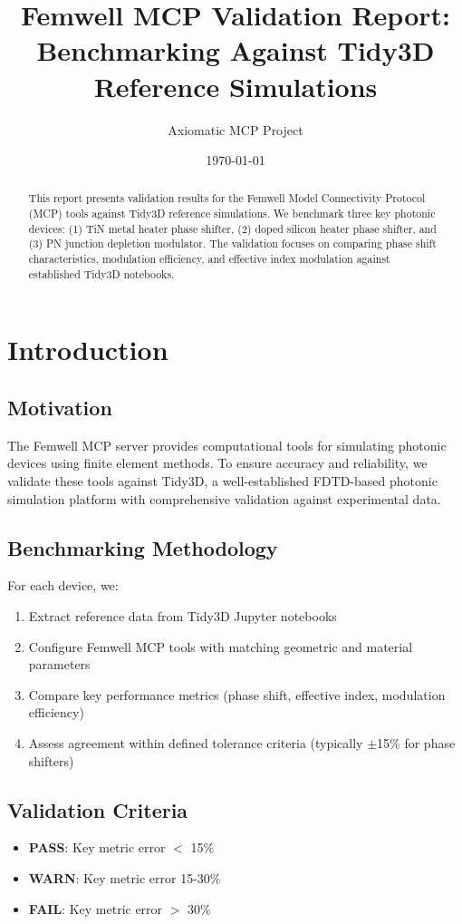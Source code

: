 \documentclass[11pt,a4paper]{article}
\title{\textbf{Femwell MCP Validation Report:\\Benchmarking Against Tidy3D Reference Simulations}}
\author{Axiomatic MCP Project}
\date{\today}
\begin{document}
\maketitle

\begin{abstract}
This report presents validation results for the Femwell Model Connectivity Protocol (MCP) tools against Tidy3D reference simulations. We benchmark three key photonic devices: (1) TiN metal heater phase shifter, (2) doped silicon heater phase shifter, and (3) PN junction depletion modulator. The validation focuses on comparing phase shift characteristics, modulation efficiency, and effective index modulation against established Tidy3D notebooks.
\end{abstract}

\tableofcontents
\newpage

\section{Introduction}

\subsection{Motivation}
The Femwell MCP server provides computational tools for simulating photonic devices using finite element methods. To ensure accuracy and reliability, we validate these tools against Tidy3D, a well-established FDTD-based photonic simulation platform with comprehensive validation against experimental data.

\subsection{Benchmarking Methodology}
For each device, we:
\begin{enumerate}
    \item Extract reference data from Tidy3D Jupyter notebooks
    \item Configure Femwell MCP tools with matching geometric and material parameters
    \item Compare key performance metrics (phase shift, effective index, modulation efficiency)
    \item Assess agreement within defined tolerance criteria (typically $\pm$15\% for phase shifters)
\end{enumerate}

\subsection{Validation Criteria}
\begin{itemize}
    \item \textcolor{passgreen}{\textbf{PASS}}: Key metric error $<$ 15\%
    \item \textcolor{warncolor}{\textbf{WARN}}: Key metric error 15-30\%
    \item \textcolor{failred}{\textbf{FAIL}}: Key metric error $>$ 30\%
\end{itemize}
\end{document}
